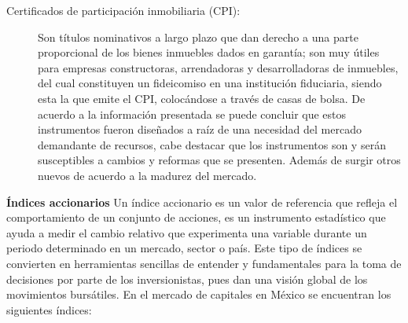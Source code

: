 \documentclass[10pt,letterpaper]{book}
\begin{document}
\begin{description}
    \item[Certificados de participación inmobiliaria (CPI):] \hfill \break Son títulos nominativos a largo plazo que dan derecho a una parte proporcional de los bienes inmuebles dados en garantía; son muy útiles para empresas constructoras, arrendadoras y desarrolladoras de inmuebles, del cual constituyen un fideicomiso en una institución fiduciaria, siendo esta la que emite el CPI, colocándose a través de casas de bolsa.
    De acuerdo a la información presentada se puede concluir que estos instrumentos fueron diseñados a raíz de una necesidad del mercado demandante de recursos, cabe destacar que los instrumentos son y serán susceptibles a cambios y reformas que se presenten. Además de surgir otros nuevos de acuerdo a la madurez del mercado.
\end{description}

\textbf{Índices accionarios}
Un índice accionario es un valor de referencia que refleja el comportamiento de un conjunto de acciones, es un instrumento estadístico que ayuda a medir el cambio relativo que experimenta una variable durante un periodo determinado en un mercado, sector o país. Este tipo de índices se convierten en herramientas sencillas de entender y fundamentales para la toma de decisiones por parte de los inversionistas, pues dan una visión global de los movimientos bursátiles. En el mercado de capitales en México se encuentran los siguientes índices:
\end{document}
